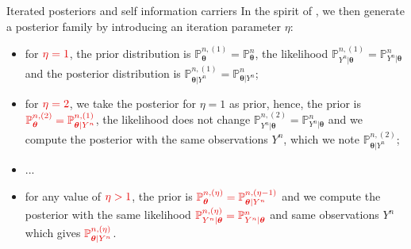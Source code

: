\documentclass[10pt]{beamer}
\begin{document}
%


\begin{frame}{Iterated posteriors and self information carriers}
In the spirit of \textsc{\citet{OBJJ}}, we then generate a posterior family by introducing an \textcolor{red!90!black}{iteration parameter $\eta$}:
\begin{itemize}
\setlength\itemsep{1em}
\item<1-> for $\textcolor{red!90!black}{\eta = 1}$, the prior distribution is $\mathbb{P}_{\boldsymbol{\theta}}^{n, (1)} = \mathbb{P}_{\boldsymbol{\theta}}^{n}$, the likelihood $\mathbb{P}_{Y^{n} \vert \boldsymbol{\theta}}^{n, (1)} = \mathbb{P}_{Y^{n} \vert \boldsymbol{\theta}}^{n}$ and the posterior distribution is $\mathbb{P}_{\boldsymbol{\theta} \vert Y^{n}}^{n, (1)} = \mathbb{P}_{\boldsymbol{\theta}\vert Y^{n}}^{n}$;
\item<2-> for $\textcolor{red!90!black}{\eta = 2}$, we take the posterior for $\eta = 1$ as prior, hence, the \textcolor{red!90!black}{prior is} $\textcolor{red!90!black}{\mathbb{P}_{\boldsymbol{\theta}}^{n, (2)} = \mathbb{P}_{\boldsymbol{\theta} \vert Y^{n}}^{n, (1)}}$, the likelihood does not change $\mathbb{P}_{Y^{n} \vert \boldsymbol{\theta}}^{n, (2)} = \mathbb{P}_{Y^{n} \vert \boldsymbol{\theta}}^{n}$ and we compute the posterior with the same observations $Y^{n}$, which we note $\mathbb{P}_{\boldsymbol{\theta} \vert Y^{n}}^{n, (2)}$;
\item<3->...
\item<4-> for any value of $\textcolor{red!90!black}{\eta > 1}$, the prior is $\textcolor{red!90!black}{\mathbb{P}_{\boldsymbol{\theta}}^{n, (\eta)} = \mathbb{P}_{\boldsymbol{\theta} \vert Y^{n}}^{n, (\eta-1)}}$ and we compute the posterior with the same likelihood $\textcolor{red!90!black}{\mathbb{P}_{Y^{n} \vert \boldsymbol{\theta}}^{n, (\eta)} = \mathbb{P}_{Y^{n} \vert \boldsymbol{\theta}}^{n}}$ and same observations $Y^{n}$ which gives $\textcolor{red!90!black}{\mathbb{P}_{\boldsymbol{\theta} \vert Y^{n}}^{n, (\eta)}}$.
\end{itemize}
\end{frame}
\end{document}
